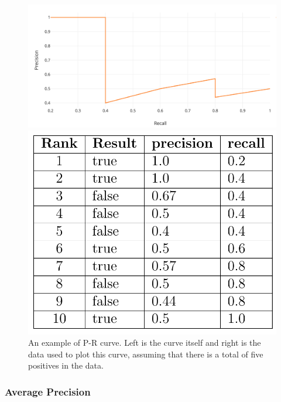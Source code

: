 \begin{figure}
    \centering
    \begin{minipage}[b]{0.65\textwidth}
        \centering
        \includegraphics[width=\linewidth]{figures/eval_pr_curve.png}
    \end{minipage}%
    \begin{minipage}[b]{0.35\textwidth}
        \centering
        \includegraphics[width=\linewidth]{figures/eval_pr_curve_data.png}
    \end{minipage}
    \caption[An example of Precision-Recall curve]
    {An example of P-R curve. Left is the curve itself and right is the data
        used to plot this curve, assuming that there is a total of five positives
        in the data.}
    \label{fig:eval-pr-curve}
\end{figure}

\subsubsection{Average Precision}
\label{sec:Eval-ap}

